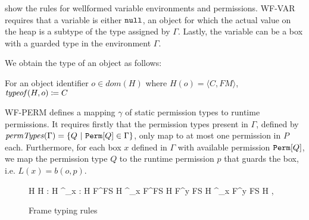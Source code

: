  show the rules for wellformed variable environments and permissions. WF-VAR requires that a variable is either $\texttt{null}$, an object for which the actual value on the heap is a subtype of the type assigned by $\Gamma$. Lastly, the variable can be a box with a guarded type in the environment $\Gamma$.

We obtain the type of an object as follows:
\begin{definition}
  For an object identifier $o \in dom(H)$ where $H(o) = \langle C, FM \rangle$, $\mathop{\mathit{typeof}}(H, o) \coloneq C$
\end{definition}
    
WF-PERM defines a mapping $\gamma$ of static permission types to runtime permissions. It requires firstly that the permission types present in $\Gamma$, defined by $\vn{permTypes}(\Gamma) = \{Q\ |\ \mn{Perm}[Q] \in \Gamma \}$, only map to at most one permission in $P$ each. Furthermore, for each box $x$ defined in $\Gamma$ with available permission $\texttt{Perm}[Q]$, we map the permission type $Q$ to the runtime permission $p$ that guards the box, i.e. $L(x) = b(o, p)$.

\begin{figure}
\vspace{3mm}
\infrule[T-EMPFS]{}
    {H \vdash \epsilon}
\vspace{3mm}
    {H \vdash {} : \sigma}
\vspace{3mm}
    {H \vdash^\tau_x  : \sigma}
\vspace{3mm}
    {H \vdash F^\epsilon \circ FS}
\vspace{3mm}
    {H \vdash^\tau_x F^\epsilon \circ FS}
\vspace{3mm}
    {H \vdash F^y \circ FS}
\vspace{3mm}
    {H \vdash^\tau_x F^y \circ FS}
\vspace{3mm}
        {H \vdash \TS, \WS}
    \caption{Frame typing rules}
    \label{fig:frame-typing}
\end{figure}

